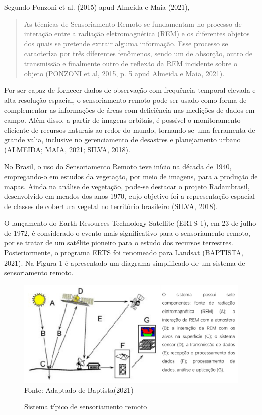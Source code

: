 \documentclass[fleqn]{icat-ufal}
\begin{document}
Segundo \citeauthoronline{}Ponzoni et al. (2015) apud Almeida e Maia (2021),
\begin{quote}
    As técnicas de Sensoriamento Remoto se fundamentam no processo de interação entre a radiação eletromagnética (REM) e os diferentes objetos dos quais se pretende extrair alguma informação. Esse processo se caracteriza por três diferentes fenômenos, sendo um de absorção, outro de transmissão e finalmente outro de reflexão da REM incidente sobre o objeto (PONZONI et al, 2015, p. 5 apud Almeida e Maia, 2021).
\end{quote}

Por ser capaz de fornecer dados de observação com frequência temporal elevada e alta resolução espacial, o sensoriamento remoto pode ser usado como forma de complementar as informações de áreas com deficiência nas medições de dados em campo. Além disso, a partir de imagens orbitais, é possível o monitoramento eficiente de recursos naturais ao redor do mundo, tornando-se uma ferramenta de grande valia, inclusive no gerenciamento de desastres e planejamento urbano (ALMEIDA; MAIA, 2021; SILVA, 2018).

No Brasil, o uso do Sensoriamento Remoto teve início na década de 1940, empregando-o em estudos da vegetação, por meio de imagens, para a produção de mapas. Ainda na análise de vegetação, pode-se destacar o projeto Radambrasil, desenvolvido em meados dos anos 1970, cujo objetivo foi a representação espacial de classes de cobertura vegetal no território brasileiro (SILVA, 2018). 

O lançamento do Earth Resources Technology Satellite (ERTS-1), em 23 de julho de 1972, é considerado o evento mais significativo para o sensoriamento remoto, por se tratar de um satélite pioneiro para o estudo dos recursos terrestres. Posteriormente, o programa ERTS foi renomeado para Landsat (BAPTISTA, 2021). Na Figura 1 é apresentado um diagrama simplificado de um sistema de sensoriamento remoto.

\begin{figure}
  \centering
  \caption[Sistema típico de sensoriamento remoto] %
          {Sistema típico de sensoriamento remoto}
  \label{fig:rem_sens}
  \includegraphics[width=.5\linewidth]{figs/sens_remoto_tipico.png}
  \\ Fonte: Adaptado de Baptista(2021)
\end{figure}
\end{document}
